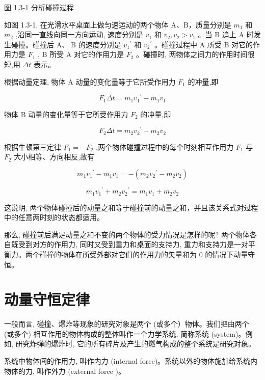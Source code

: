 \documentclass[10pt]{article}
\begin{document}
图 1.3-1 分析碰撞过程

如图 1.3-1, 在光滑水平桌面上做匀速运动的两个物体 A、B，质量分别是 \({m}_{1}\) 和 \({m}_{2}\) ,沿同一直线向同一方向运动, 速度分别是 \({v}_{1}\) 和 \({v}_{2},{v}_{2} > {v}_{1}\) 。当 \(\mathrm{B}\) 追上 \(\mathrm{A}\) 时发生碰撞。碰撞后 \(\mathrm{A}\text{、}\mathrm{\;B}\) 的速度分别是 \({v}_{1}{}^{\prime }\) 和 \({v}_{2}{}^{\prime }\) 。碰撞过程中 \(\mathrm{A}\) 所受 \(\mathrm{B}\) 对它的作用力是 \({F}_{1}\) , \(\mathrm{B}\) 所受 \(\mathrm{A}\) 对它的作用力是 \({F}_{2}\) 。碰撞时, 两物体之间力的作用时间很短,用 \({\Delta t}\) 表示。

根据动量定理, 物体 A 动量的变化量等于它所受作用力 \({F}_{1}\) 的冲量,即

\[
{F}_{1}{\Delta t} = {m}_{1}{v}_{1}{}^{\prime } - {m}_{1}{v}_{1}
\]

物体 \(\mathrm{B}\) 动量的变化量等于它所受作用力 \({F}_{2}\) 的冲量,即

\[
{F}_{2}{\Delta t} = {m}_{2}{v}_{2}{}^{\prime } - {m}_{2}{v}_{2}
\]

根据牛顿第三定律 \({F}_{1} = - {F}_{2}\) ,两个物体碰撞过程中的每个时刻相互作用力 \({F}_{1}\) 与 \({F}_{2}\) 大小相等、方向相反,故有

\[
{m}_{1}{v}_{1}{}^{\prime } - {m}_{1}{v}_{1} = - \left( {{m}_{2}{v}_{2}{}^{\prime } - {m}_{2}{v}_{2}}\right)
\]

\[
{m}_{1}{v}_{1}{}^{\prime } + {m}_{2}{v}_{2}{}^{\prime } = {m}_{1}{v}_{1} + {m}_{2}{v}_{2} \tag{1}
\]

这说明, 两个物体碰撞后的动量之和等于碰撞前的动量之和，并且该关系式对过程中的任意两时刻的状态都适用。

那么, 碰撞前后满足动量之和不变的两个物体的受力情况是怎样的呢? 两个物体各自既受到对方的作用力, 同时又受到重力和桌面的支持力, 重力和支持力是一对平衡力。两个碰撞的物体在所受外部对它们的作用力的矢量和为 0 的情况下动量守恒。

\section*{动量守恒定律}

一般而言, 碰撞、爆炸等现象的研究对象是两个 (或多个）物体。我们把由两个 (或多个) 相互作用的物体构成的整体叫作一个力学系统, 简称系统 (system)。例如, 研究炸弹的爆炸时, 它的所有碎片及产生的燃气构成的整个系统是研究对象。

系统中物体间的作用力, 叫作内力 (internal force)。系统以外的物体施加给系统内物体的力, 叫作外力 (external force )。
\end{document}
